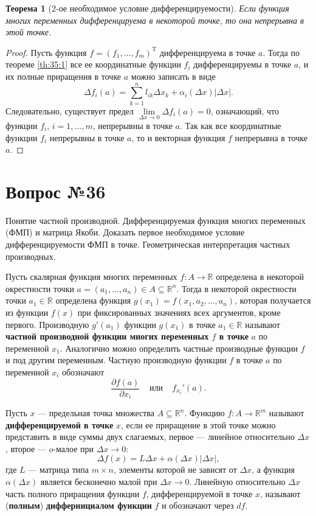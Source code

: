 \documentclass[12pt]{report}
\numberwithin{equation}{section}
\newtheorem{theorem}{Теорема}[section]
\begin{document}
\begin{theorem}[2-ое необходимое условие дифференцируемости] \label{th:35:2}
Если функция многих переменных дифференцируема в некоторой точке, то она непрерывна в этой точке.
\end{theorem}
\begin{proof}
Пусть функция $f = (f_1, \ldots, f_m)^{\mathrm{T}}$ дифференцируема в точке $a$. Тогда по теореме \ref{th:35:1} все ее координатные функции $f_i$ дифференцируемы в точке $a$, и их полные приращения в точке $a$ можно записать в виде
\[ \Delta f_i (a) = \sum_{k =1}^n l_{ik} \Delta x_k + \alpha_i(\Delta x)|\Delta x|.\]
Следовательно, существует предел $\lim\limits_{\Delta x \to 0}\Delta f_i(a) = 0$, означающий, что функции $f_i$, $i = 1, \ldots, m$, непрерывны в точке $a$. Так как все координатные функции $f_i$ непрерывны в точке $a$, то и векторная функция $f$ непрерывна в точке $a$.
\end{proof}

\newpage \section{Вопрос №36} %
\begin{framed}
Понятие частной производной. Дифференцируемая функция многих переменных (ФМП) и матрица Якоби. Доказать первое необходимое условие дифференцируемости ФМП в точке. Геометрическая интерпретация частных производных.
\end{framed}
Пусть скалярная функция многих переменных $f : A \to \mathbb{R}$ определена в некоторой окрестности точки $a = (a_1, \ldots, a_n) \in A \subseteq \mathbb{R}^n$. Тогда в некоторой окрестности точки $a_1 \in \mathbb{R}$ определена функция $g(x_1) = f(x_1, a_2, \ldots, a_n)$, которая получается из функции $f(x)$ при фиксированных значениях всех аргументов, кроме первого. Производную $g'(a_1)$ функции $g(x_1)$ в точке $a_1 \in \mathbb{R}$ называют \textbf{частной производной функции многих переменных $f$ в точке} $a$ по переменной $x_1$. Аналогично можно определить частные производные функции $f$ и под другим переменным. Частную производную функции $f$ в точке $a$ по переменной $x_i$ обозначают
\[\frac{\partial f(a) }{\partial x_i}~~~~~\text{или}~~~~~f_{x_i}'(a).\]

Пусть $x$ --- предельная точка множества $A \subseteq \mathbb{R}^n$. Функцию $f: A \to \mathbb{R}^m$ называют \textbf{дифференцируемой в точке} $x$, если ее приращение в этой точке можно представить в виде суммы двух слагаемых, первое --- линейное относительно $\Delta x$, второе --- $o$-малое при $\Delta x \to 0$:
\begin{equation} \label{eq:36:1}
\Delta f(x) = L \Delta x + \alpha(\Delta x)|\Delta x|,
\end{equation}
где $L$ --- матрица типа $m \times n$, элементы которой не зависят от $\Delta x$, а функция $\alpha(\Delta x)$ является бесконечно малой при $\Delta x \to 0$. Линейную относительно $\Delta x$ часть полного приращения функции $f$, дифференцируемой в точке $x$, называют (\textbf{полным}) \textbf{диффернициалом функции} $f$ и обозначают через $df$.\\
\end{document}
